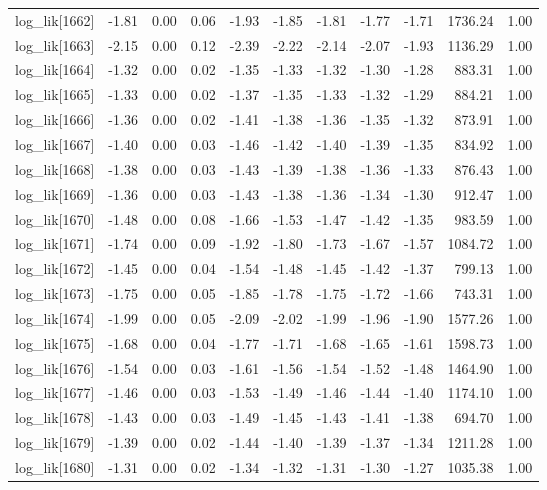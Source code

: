 \begin{table}[ht]
\begin{tabular}{rrrrrrrrrrr}
  log\_lik[1662] & -1.81 & 0.00 & 0.06 & -1.93 & -1.85 & -1.81 & -1.77 & -1.71 & 1736.24 & 1.00 \\ 
  log\_lik[1663] & -2.15 & 0.00 & 0.12 & -2.39 & -2.22 & -2.14 & -2.07 & -1.93 & 1136.29 & 1.00 \\ 
  log\_lik[1664] & -1.32 & 0.00 & 0.02 & -1.35 & -1.33 & -1.32 & -1.30 & -1.28 & 883.31 & 1.00 \\ 
  log\_lik[1665] & -1.33 & 0.00 & 0.02 & -1.37 & -1.35 & -1.33 & -1.32 & -1.29 & 884.21 & 1.00 \\ 
  log\_lik[1666] & -1.36 & 0.00 & 0.02 & -1.41 & -1.38 & -1.36 & -1.35 & -1.32 & 873.91 & 1.00 \\ 
  log\_lik[1667] & -1.40 & 0.00 & 0.03 & -1.46 & -1.42 & -1.40 & -1.39 & -1.35 & 834.92 & 1.00 \\ 
  log\_lik[1668] & -1.38 & 0.00 & 0.03 & -1.43 & -1.39 & -1.38 & -1.36 & -1.33 & 876.43 & 1.00 \\ 
  log\_lik[1669] & -1.36 & 0.00 & 0.03 & -1.43 & -1.38 & -1.36 & -1.34 & -1.30 & 912.47 & 1.00 \\ 
  log\_lik[1670] & -1.48 & 0.00 & 0.08 & -1.66 & -1.53 & -1.47 & -1.42 & -1.35 & 983.59 & 1.00 \\ 
  log\_lik[1671] & -1.74 & 0.00 & 0.09 & -1.92 & -1.80 & -1.73 & -1.67 & -1.57 & 1084.72 & 1.00 \\ 
  log\_lik[1672] & -1.45 & 0.00 & 0.04 & -1.54 & -1.48 & -1.45 & -1.42 & -1.37 & 799.13 & 1.00 \\ 
  log\_lik[1673] & -1.75 & 0.00 & 0.05 & -1.85 & -1.78 & -1.75 & -1.72 & -1.66 & 743.31 & 1.00 \\ 
  log\_lik[1674] & -1.99 & 0.00 & 0.05 & -2.09 & -2.02 & -1.99 & -1.96 & -1.90 & 1577.26 & 1.00 \\ 
  log\_lik[1675] & -1.68 & 0.00 & 0.04 & -1.77 & -1.71 & -1.68 & -1.65 & -1.61 & 1598.73 & 1.00 \\ 
  log\_lik[1676] & -1.54 & 0.00 & 0.03 & -1.61 & -1.56 & -1.54 & -1.52 & -1.48 & 1464.90 & 1.00 \\ 
  log\_lik[1677] & -1.46 & 0.00 & 0.03 & -1.53 & -1.49 & -1.46 & -1.44 & -1.40 & 1174.10 & 1.00 \\ 
  log\_lik[1678] & -1.43 & 0.00 & 0.03 & -1.49 & -1.45 & -1.43 & -1.41 & -1.38 & 694.70 & 1.00 \\ 
  log\_lik[1679] & -1.39 & 0.00 & 0.02 & -1.44 & -1.40 & -1.39 & -1.37 & -1.34 & 1211.28 & 1.00 \\ 
  log\_lik[1680] & -1.31 & 0.00 & 0.02 & -1.34 & -1.32 & -1.31 & -1.30 & -1.27 & 1035.38 & 1.00 \\ 

\end{tabular}
\end{table}
